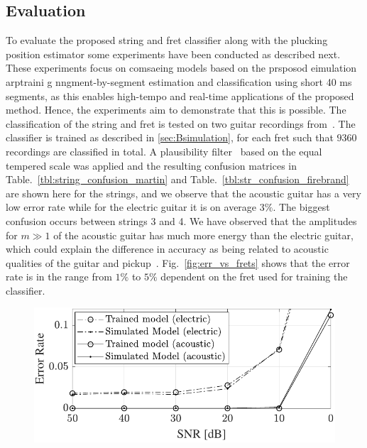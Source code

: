 \documentclass{article}
\begin{document}
\begin{sloppy}
\section{Evaluation} %
\label{sec:experiments}
To evaluate the proposed string and fret classifier along  with the plucking position estimator some experiments have been conducted as described next. These experiments focus on comsaeing models based on the prsposod eimulation arptraini g nngment-by-segment estimation and classification using short 40 ms segments, as this enables high-tempo and real-time applications of the proposed method. Hence, the experiments aim to demonstrate that this is possible.
%
The classification of the string and fret is tested on two guitar recordings from~\cite{hjerrild::icassp19}. 
The classifier is trained as described in \ref{sec:Bsimulation}, for each fret such that %
$9360$ recordings are classified in total. A plausibility filter~\cite{abesser:automatic_string_detection_ml} based on the equal tempered scale was applied and the resulting confusion matrices in Table.~\ref{tbl:string_confusion_martin} and Table.~\ref{tbl:str_confusion_firebrand} are shown here for the strings, and we observe that the acoustic guitar has a very low error rate while for the electric guitar it is on average $3\%$. The biggest confusion occurs between strings 3 and 4. We have observed that the amplitudes for $m\!\!\gg\!\!1$ of the acoustic guitar has much more energy than the electric guitar, which could explain the difference in accuracy as being related to acoustic qualities of the guitar and pickup~\cite{fletcher:physics_of_musical_instruments}.  
Fig.~\ref{fig:err_vs_frets} shows that the error rate is in the range from $1\%$ to $5\%$ dependent on the fret used for training the classifier. %
%
\begin{figure}[t]
\centering
   \includegraphics[width=.86\linewidth]{img/SNRfig_both.pdf}\vspace{-2mm}

\end{figure}
\end{sloppy}
\end{document}
